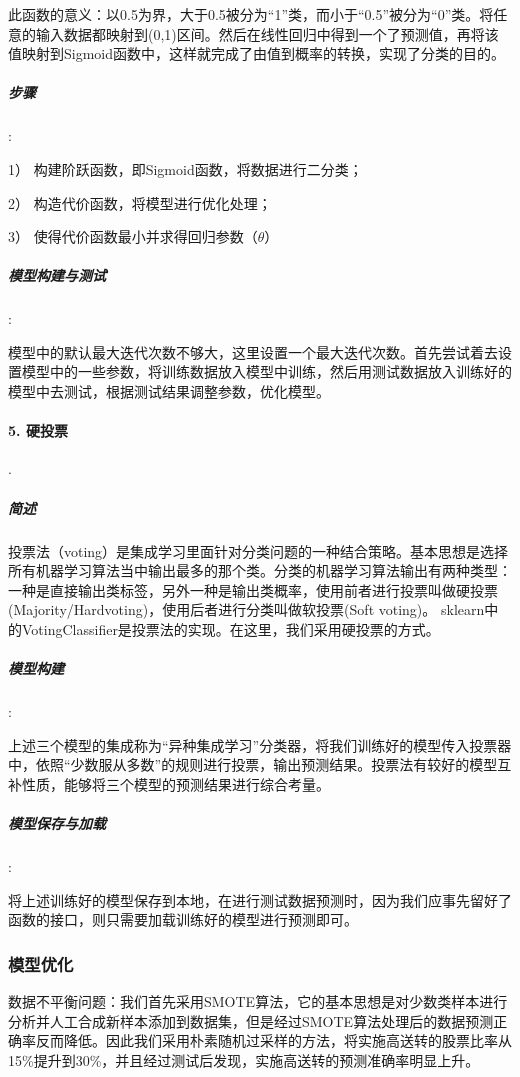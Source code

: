 \documentclass[lang=cn,12pt]{elegantpaper}
\begin{document}
此函数的意义：以0.5为界，大于0.5被分为“1”类，而小于“0.5”被分为“0”类。将任意的输入数据都映射到(0,1)区间。然后在线性回归中得到一个了预测值，再将该值映射到Sigmoid函数中，这样就完成了由值到概率的转换，实现了分类的目的。

\subparagraph{步骤}:

1） 构建阶跃函数，即Sigmoid函数，将数据进行二分类；

2） 构造代价函数，将模型进行优化处理；

3） 使得代价函数最小并求得回归参数（$\theta$）

\subparagraph{模型构建与测试}:

模型中的默认最大迭代次数不够大，这里设置一个最大迭代次数。首先尝试着去设置模型中的一些参数，将训练数据放入模型中训练，然后用测试数据放入训练好的模型中去测试，根据测试结果调整参数，优化模型。

\paragraph{5. 硬投票}.

\subparagraph{简述}

投票法（voting）是集成学习里面针对分类问题的一种结合策略。基本思想是选择所有机器学习算法当中输出最多的那个类。分类的机器学习算法输出有两种类型：一种是直接输出类标签，另外一种是输出类概率，使用前者进行投票叫做硬投票(Majority/Hardvoting)，使用后者进行分类叫做软投票(Soft voting)。
sklearn中的VotingClassifier是投票法的实现。在这里，我们采用硬投票的方式。

\subparagraph{模型构建}:

上述三个模型的集成称为“异种集成学习”分类器，将我们训练好的模型传入投票器中，依照“少数服从多数”的规则进行投票，输出预测结果。投票法有较好的模型互补性质，能够将三个模型的预测结果进行综合考量。

\subparagraph{模型保存与加载}:

将上述训练好的模型保存到本地，在进行测试数据预测时，因为我们应事先留好了函数的接口，则只需要加载训练好的模型进行预测即可。

\subsubsection{模型优化}

数据不平衡问题：我们首先采用SMOTE算法，它的基本思想是对少数类样本进行分析并人工合成新样本添加到数据集，但是经过SMOTE算法处理后的数据预测正确率反而降低。因此我们采用朴素随机过采样的方法，将实施高送转的股票比率从15\%提升到30\%，并且经过测试后发现，实施高送转的预测准确率明显上升。
\end{document}
